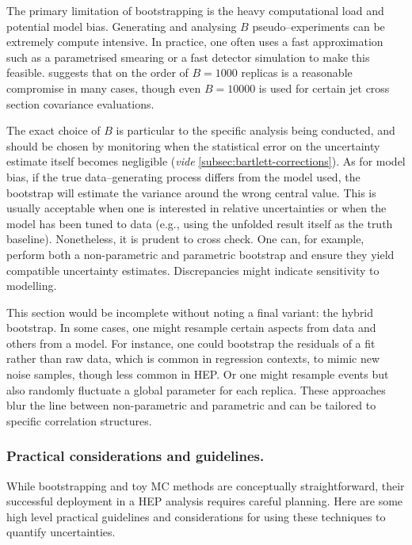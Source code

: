         The primary limitation of bootstrapping is the heavy computational load and potential model bias.
        Generating and analysing $B$ pseudo--experiments can be extremely compute intensive.
        In practice, one often uses a fast approximation such as a parametrised smearing or a fast detector simulation to make this feasible.
        \cite{noauthor_evaluating_2021} suggests that on the order of $B=\num{1000}$ replicas is a reasonable compromise in many cases, though even $B=\num{10000}$ is used for certain jet cross section covariance evaluations.
        
        The exact choice of $B$ is particular to the specific analysis being conducted, and should be chosen by monitoring when the statistical error on the uncertainty estimate itself becomes negligible (\textit{vide} \cref{subsec:bartlett-corrections}).
        As for model bias, if the true data--generating process differs from the model used, the bootstrap will estimate the variance around the wrong central value.
        This is usually acceptable when one is interested in relative uncertainties or when the model has been tuned to data (e.g., using the unfolded result itself as the truth baseline).
        Nonetheless, it is prudent to cross check.
        One can, for example, perform both a non-parametric and parametric bootstrap and ensure they yield compatible uncertainty estimates.
        Discrepancies might indicate sensitivity to modelling.

        This section would be incomplete without noting a final variant: the hybrid bootstrap.
        In some cases, one might resample certain aspects from data and others from a model.
        For instance, one could bootstrap the residuals of a fit rather than raw data, which is common in regression contexts, to mimic new noise samples, though less common in HEP.
        Or one might resample events but also randomly fluctuate a global parameter for each replica.
        These approaches blur the line between non-parametric and parametric and can be tailored to specific correlation structures.

    \subsubsection{Practical considerations and guidelines.}
        While bootstrapping and toy MC methods are conceptually straightforward, their successful deployment in a HEP analysis requires careful planning.
        Here are some high level practical guidelines and considerations for using these techniques to quantify uncertainties.
